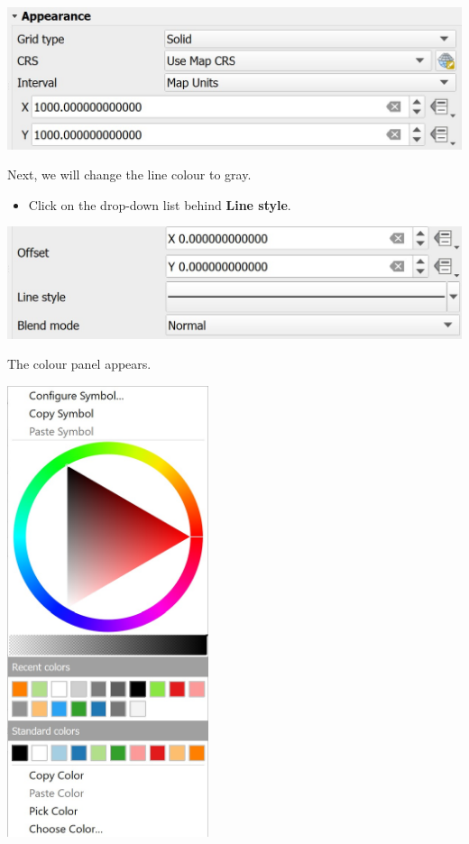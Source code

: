 \documentclass[
  letterpaper,
  DIV=11,
  numbers=noendperiod]{scrreprt}
\providecommand{\tightlist}{%
  \setlength{\itemsep}{0pt}\setlength{\parskip}{0pt}}\usepackage{longtable,booktabs,array}
\begin{document}
\includegraphics[width=6.16667in,height=\textheight]{./img04/image54.jpg}

Next, we will change the line colour to gray.

\begin{itemize}
\tightlist
\item
  Click on the drop-down list behind \textbf{Line style}.
\end{itemize}

\includegraphics{./img04/image55.jpg}

The colour panel appears.

\includegraphics[width=2.32292in,height=\textheight]{./img04/image56.jpg}
\end{document}
